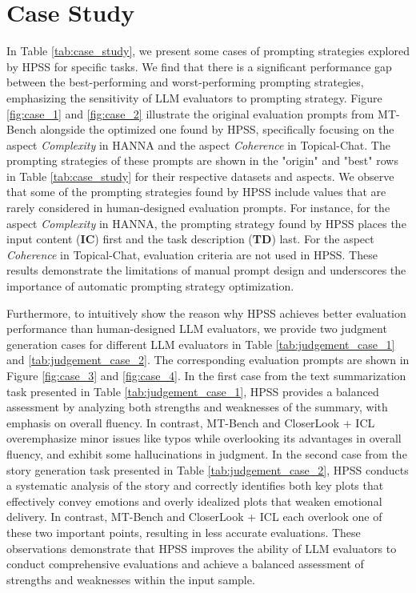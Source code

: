 \section{Case Study}
\label{app:case}
In Table \ref{tab:case_study}, we present some cases of prompting strategies explored by HPSS for specific tasks. 
We find that there is a significant performance gap between the best-performing and worst-performing prompting strategies, 
emphasizing the sensitivity of LLM evaluators to prompting strategy. 
Figure \ref{fig:case_1} and \ref{fig:case_2} illustrate the original evaluation prompts from MT-Bench alongside the optimized one found by HPSS, specifically focusing on the aspect \textit{Complexity} in HANNA and the aspect \textit{Coherence} in Topical-Chat.
The prompting strategies of these prompts are shown in the "origin" and "best" rows in Table \ref{tab:case_study} for their respective datasets and aspects.
We observe that some of the prompting strategies found by HPSS include values that are rarely considered in human-designed evaluation prompts. 
For instance, for the aspect \textit{Complexity} in HANNA, the prompting strategy found by HPSS places the input content (\textbf{IC}) first and the task description (\textbf{TD}) last.
For the aspect \textit{Coherence} in Topical-Chat, evaluation criteria are not used in HPSS. 
These results demonstrate the limitations of manual prompt design and underscores the importance of automatic prompting strategy optimization.

Furthermore, to intuitively show the reason why HPSS achieves better evaluation performance than human-designed LLM evaluators, we
provide two judgment generation cases for different LLM evaluators in Table \ref{tab:judgement_case_1} and \ref{tab:judgement_case_2}. 
The corresponding evaluation prompts are shown in Figure \ref{fig:case_3} and \ref{fig:case_4}.
In the first case from the text summarization task presented in Table \ref{tab:judgement_case_1}, HPSS provides a balanced assessment by analyzing both strengths and weaknesses of the summary, with emphasis on overall fluency. 
In contrast, MT-Bench and CloserLook + ICL overemphasize minor issues like typos while overlooking its advantages in overall fluency, and exhibit some hallucinations in judgment.
In the second case from the story generation task presented in Table \ref{tab:judgement_case_2},
HPSS conducts a systematic analysis of the story and correctly identifies both key plots that effectively convey emotions and overly idealized plots that weaken emotional delivery. 
In contrast, MT-Bench and CloserLook + ICL each overlook one of these two important points, resulting in less accurate evaluations. 
These observations demonstrate that HPSS improves the ability of LLM evaluators to conduct comprehensive evaluations
and achieve a balanced assessment of strengths and weaknesses within the input sample.

